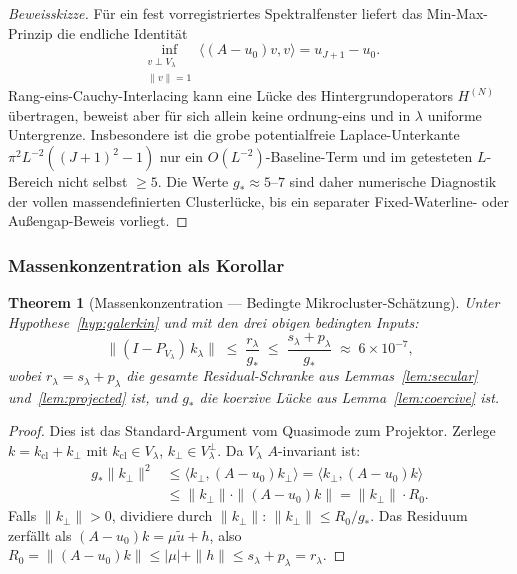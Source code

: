 \documentclass[11pt,a4paper]{article}
\theoremstyle{plain}
\newtheorem{theorem}{Theorem}[section]
\theoremstyle{definition}
\begin{document}
\begin{proof}[Beweisskizze]
Für ein fest vorregistriertes Spektralfenster liefert das Min-Max-Prinzip
die endliche Identität
\[
  \inf_{\substack{v\perp V_\lambda\\ \|v\|=1}}
  \langle(A-u_0)v,v\rangle = u_{J+1}-u_0 .
\]
Rang-eins-Cauchy-Interlacing kann eine Lücke des Hintergrundoperators
$H^{(N)}$ übertragen, beweist aber für sich allein keine
ordnung-eins und in $\lambda$ uniforme Untergrenze. Insbesondere ist die
grobe potentialfreie Laplace-Unterkante
$\pi^2 L^{-2}((J+1)^2-1)$ nur ein $O(L^{-2})$-Baseline-Term und im
getesteten $L$-Bereich nicht selbst $\geq5$. Die Werte $g_*\approx5$--$7$
sind daher numerische Diagnostik der vollen massendefinierten Clusterlücke,
bis ein separater Fixed-Waterline- oder Außengap-Beweis vorliegt.
\end{proof}

\subsubsection{Massenkonzentration als Korollar}

\begin{theorem}[Massenkonzentration --- Bedingte Mikrocluster-Schätzung]
\label{thm:mass-concentration}
Unter Hypothese~\ref{hyp:galerkin} und mit den drei obigen bedingten Inputs:
\[
  \|(I - P_{V_\lambda})\, k_\lambda\|
  \;\leq\; \frac{r_\lambda}{g_*}
  \;\leq\; \frac{s_\lambda + p_\lambda}{g_*}
  \;\approx\; 6 \times 10^{-7},
\]
wobei $r_\lambda = s_\lambda + p_\lambda$ die gesamte Residual-Schranke
aus Lemmas~\ref{lem:secular} und~\ref{lem:projected} ist, und
$g_*$ die koerzive Lücke aus Lemma~\ref{lem:coercive} ist.
\end{theorem}

\begin{proof}
Dies ist das Standard-Argument vom Quasimode zum Projektor. Zerlege
$k = k_{\mathrm{cl}} + k_\perp$ mit $k_{\mathrm{cl}} \in V_\lambda$,
$k_\perp \in V_\lambda^\perp$. Da $V_\lambda$ $A$-invariant ist:
\begin{align*}
  g_* \|k_\perp\|^2
  &\leq \langle k_\perp, (A-u_0) k_\perp \rangle
  = \langle k_\perp, (A-u_0) k \rangle \\
  &\leq \|k_\perp\| \cdot \|(A-u_0)k\|
  = \|k_\perp\| \cdot R_0.
\end{align*}
Falls $\|k_\perp\| > 0$, dividiere durch $\|k_\perp\|$:
$\|k_\perp\| \leq R_0/g_*$. Das Residuum zerfällt als
$(A-u_0)k = \mu\tilde{u} + h$, also
$R_0 = \|(A-u_0)k\| \leq |\mu| + \|h\| \leq s_\lambda + p_\lambda
= r_\lambda$.
\end{proof}
\end{document}
